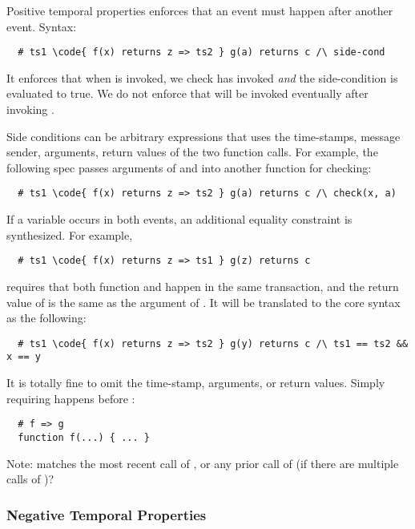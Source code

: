 Positive temporal properties enforces that an event must happen
after another event. Syntax:
\begin{lstlisting}
  # ts1 \code{ f(x) returns z => ts2 } g(a) returns c /\ side-cond
\end{lstlisting}
It enforces that when  is invoked, we check  has invoked \emph{and}
the side-condition is evaluated to true.
We do not enforce that  will be invoked eventually after invoking .

Side conditions can be arbitrary expressions that uses the time-stamps, message
sender, arguments, return values of the two function calls.
For example, the following spec passes arguments of  and  into
another function for checking:

\begin{lstlisting}
  # ts1 \code{ f(x) returns z => ts2 } g(a) returns c /\ check(x, a)
\end{lstlisting}

If a variable occurs in both events, an additional equality constraint
is synthesized.  For example,
\begin{lstlisting}
  # ts1 \code{ f(x) returns z => ts1 } g(z) returns c
\end{lstlisting}
requires that both function  and  happen in the same transaction,
and the return value of  is the same as the argument of .
It will be translated to the core syntax as the following:
\begin{lstlisting}
  # ts1 \code{ f(x) returns z => ts2 } g(y) returns c /\ ts1 == ts2 && x == y
\end{lstlisting}

It is totally fine to omit the time-stamp, arguments, or return values.
Simply requiring  happens before :
\begin{lstlisting}
  # f => g
  function f(...) { ... }
\end{lstlisting}


Note:  matches the most recent call of ,
or any prior call of  (if there are multiple calls of )?



\subsubsection{Negative Temporal Properties}

